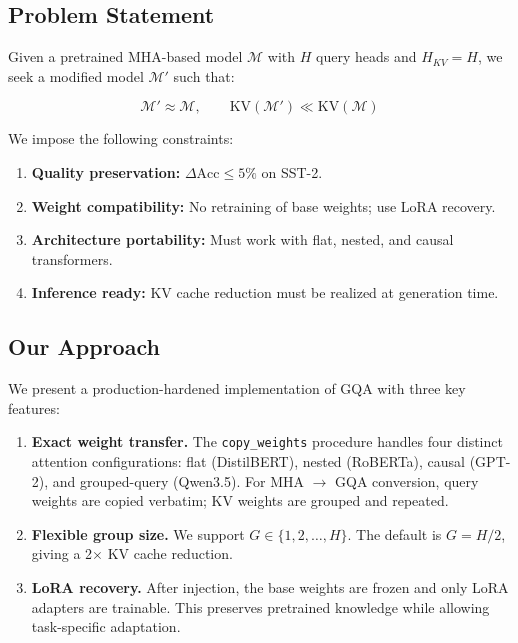 \subsection{Problem Statement}

Given a pretrained MHA-based model $\mathcal{M}$ with $H$ query heads and 
$H_{KV} = H$, we seek a modified model $\mathcal{M}'$ such that:

\[
\mathcal{M}' \approx \mathcal{M}, \qquad
\text{KV}(\mathcal{M}') \ll \text{KV}(\mathcal{M})
\tag{1.3}
\]

We impose the following constraints:

\begin{enumerate}
\item \textbf{Quality preservation:} $\Delta\text{Acc} \leq 5\%$ on SST-2.
\item \textbf{Weight compatibility:} No retraining of base weights; use LoRA recovery.
\item \textbf{Architecture portability:} Must work with flat, nested, and causal transformers.
\item \textbf{Inference ready:} KV cache reduction must be realized at generation time.

\end{enumerate}
\subsection{Our Approach}

We present a production-hardened implementation of GQA with three key features:

\begin{enumerate}
\item \textbf{Exact weight transfer.} The \texttt{copy\_weights} procedure handles four
  distinct attention configurations: flat (DistilBERT), nested (RoBERTa),
  causal (GPT-2), and grouped-query (Qwen3.5). For MHA $\to$ GQA conversion,
  query weights are copied verbatim; KV weights are grouped and repeated.

\item \textbf{Flexible group size.} We support $G \in \{1, 2, \ldots, H\}$. The
  default is $G = H / 2$, giving a 2$\times$ KV cache reduction.

\item \textbf{LoRA recovery.} After injection, the base weights are frozen and
  only LoRA adapters are trainable. This preserves pretrained knowledge
  while allowing task-specific adaptation.

\end{enumerate}
